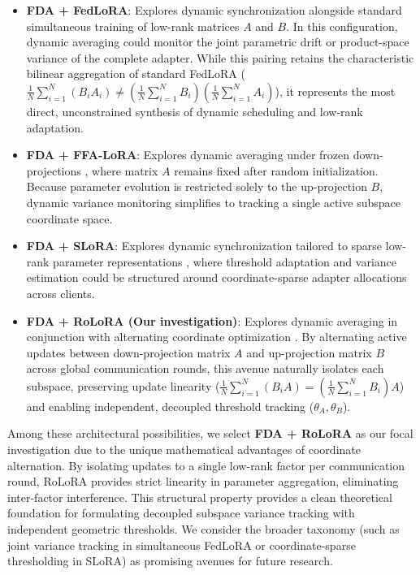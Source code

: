 \begin{itemize}
    \item \textbf{FDA + FedLoRA}: Explores dynamic synchronization alongside standard simultaneous training of low-rank matrices $A$ and $B$. In this configuration, dynamic averaging could monitor the joint parametric drift or product-space variance of the complete adapter. While this pairing retains the characteristic bilinear aggregation of standard FedLoRA ($\frac{1}{N}\sum_{i=1}^{N} (B_i A_i) \neq \left(\frac{1}{N}\sum_{i=1}^{N} B_i\right)\left(\frac{1}{N}\sum_{i=1}^{N} A_i\right)$), it represents the most direct, unconstrained synthesis of dynamic scheduling and low-rank adaptation.
    \item \textbf{FDA + FFA-LoRA}: Explores dynamic averaging under frozen down-projections \cite{sun2024improving}, where matrix $A$ remains fixed after random initialization. Because parameter evolution is restricted solely to the up-projection $B$, dynamic variance monitoring simplifies to tracking a single active subspace coordinate space.
    \item \textbf{FDA + SLoRA}: Explores dynamic synchronization tailored to sparse low-rank parameter representations \cite{babakniya2023slora}, where threshold adaptation and variance estimation could be structured around coordinate-sparse adapter allocations across clients.
    \item \textbf{FDA + RoLoRA (Our investigation)}: Explores dynamic averaging in conjunction with alternating coordinate optimization \cite{chen2025robust}. By alternating active updates between down-projection matrix $A$ and up-projection matrix $B$ across global communication rounds, this avenue naturally isolates each subspace, preserving update linearity ($\frac{1}{N}\sum_{i=1}^{N} (B_i A) = \left(\frac{1}{N}\sum_{i=1}^{N} B_i\right) A$) and enabling independent, decoupled threshold tracking ($\theta_A, \theta_B$).
\end{itemize}

Among these architectural possibilities, we select \textbf{FDA + RoLoRA} as our focal investigation due to the unique mathematical advantages of coordinate alternation. By isolating updates to a single low-rank factor per communication round, RoLoRA provides strict linearity in parameter aggregation, eliminating inter-factor interference. This structural property provides a clean theoretical foundation for formulating decoupled subspace variance tracking with independent geometric thresholds. We consider the broader taxonomy (such as joint variance tracking in simultaneous FedLoRA or coordinate-sparse thresholding in SLoRA) as promising avenues for future research.

